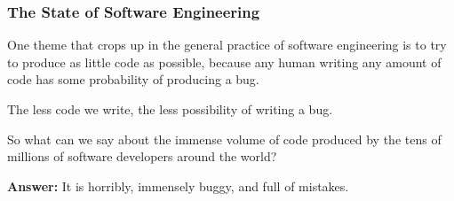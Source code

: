 \documentclass[aspectratio=169, handout]{beamer}
\begin{document}
\begin{frame}[fragile]
  \frametitle{The State of Software Engineering}

  One theme that crops up in the general practice of software engineering is to
  try to produce as little code as possible, because any human writing any
  amount of code has some probability of producing a bug.

  \pause
  \vspace{\fill}

  The less code we write, the less possibility of writing a bug.

  \pause
  \vspace{\fill}

  So what can we say about the immense volume of code produced by
  the tens of millions of software developers around the world?

  \pause
  \vspace{\fill}

  \textbf{Answer:} It is horribly, immensely buggy, and full of mistakes.
\end{frame}
\end{document}
